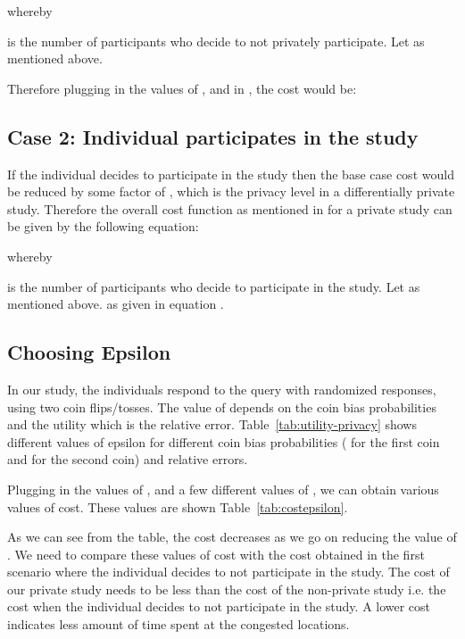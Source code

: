 \documentclass[conference]{IEEEtran}
\begin{document}
whereby

 is the number of participants who decide to not privately participate. Let  as mentioned above.

Therefore plugging in the values of ,  and  in \cite{DBLP:conf/csfw/HsuGHKNPR14}, the cost would be:



\subsection{Case 2: Individual participates in the study}

If the individual decides to participate in the study then the base case cost would be reduced by some factor of , which is the privacy level in a differentially private study.  Therefore the overall cost function as mentioned in \cite{DBLP:conf/csfw/HsuGHKNPR14} for a private study can be given by the following equation:



whereby

 is the number of participants who decide to participate in the study. Let  as mentioned above. 
 as given in equation \cite{DBLP:conf/csfw/HsuGHKNPR14}.



\subsection{Choosing Epsilon}

In our study, the individuals respond to the query with randomized responses, using two coin flips/tosses. The value of  depends on the coin bias probabilities and the utility which is the relative error. Table~\ref{tab:utility-privacy} shows different values of epsilon for different coin bias probabilities ( for the first coin and  for the second coin) and relative errors.

Plugging in the values of ,  and a few different values of , we can obtain various values of cost. These values are shown Table~\ref{tab:costepsilon}.

As we can see from the table, the cost decreases as we go on reducing the value of . We need to compare these values of cost with the cost obtained in the first scenario where the individual decides to not participate in the study. The cost of our private study needs to be less than the cost of the non-private study i.e. the cost when the individual decides to not participate in the study. A lower cost indicates less amount of time spent at the congested locations.
\end{document}
